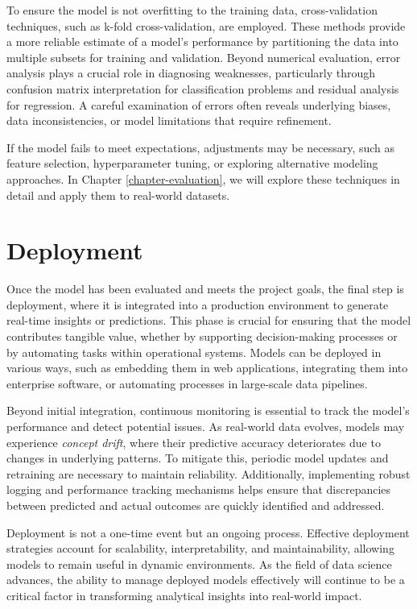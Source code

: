 \documentclass[
  11pt,
]{book}
\theoremstyle{definition}
\theoremstyle{definition}
\theoremstyle{definition}
\theoremstyle{definition}
\theoremstyle{remark}
\begin{document}
To ensure the model is not overfitting to the training data, cross-validation techniques, such as k-fold cross-validation, are employed. These methods provide a more reliable estimate of a model's performance by partitioning the data into multiple subsets for training and validation. Beyond numerical evaluation, error analysis plays a crucial role in diagnosing weaknesses, particularly through confusion matrix interpretation for classification problems and residual analysis for regression. A careful examination of errors often reveals underlying biases, data inconsistencies, or model limitations that require refinement.

If the model fails to meet expectations, adjustments may be necessary, such as feature selection, hyperparameter tuning, or exploring alternative modeling approaches. In Chapter \ref{chapter-evaluation}, we will explore these techniques in detail and apply them to real-world datasets.

\section{Deployment}\label{deployment}

Once the model has been evaluated and meets the project goals, the final step is deployment, where it is integrated into a production environment to generate real-time insights or predictions. This phase is crucial for ensuring that the model contributes tangible value, whether by supporting decision-making processes or by automating tasks within operational systems. Models can be deployed in various ways, such as embedding them in web applications, integrating them into enterprise software, or automating processes in large-scale data pipelines.

Beyond initial integration, continuous monitoring is essential to track the model's performance and detect potential issues. As real-world data evolves, models may experience \emph{concept drift}, where their predictive accuracy deteriorates due to changes in underlying patterns. To mitigate this, periodic model updates and retraining are necessary to maintain reliability. Additionally, implementing robust logging and performance tracking mechanisms helps ensure that discrepancies between predicted and actual outcomes are quickly identified and addressed.

Deployment is not a one-time event but an ongoing process. Effective deployment strategies account for scalability, interpretability, and maintainability, allowing models to remain useful in dynamic environments. As the field of data science advances, the ability to manage deployed models effectively will continue to be a critical factor in transforming analytical insights into real-world impact.
\end{document}
